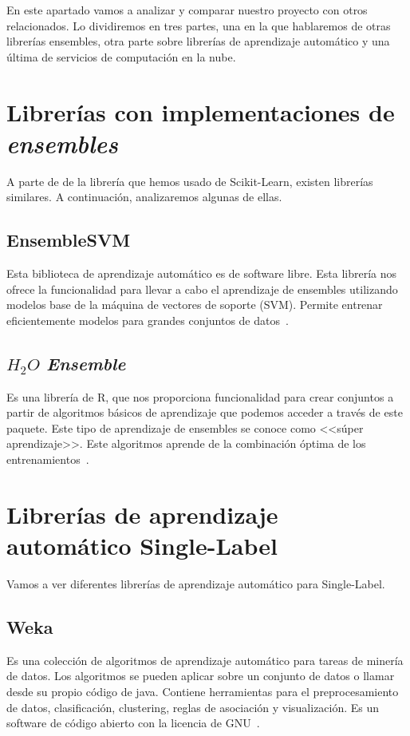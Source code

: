 En este apartado vamos a analizar y comparar nuestro proyecto con otros relacionados. Lo dividiremos en tres partes, una en la que hablaremos de otras librerías ensembles, otra parte sobre librerías de aprendizaje automático y una última de servicios de computación en la nube.

\section{Librerías con implementaciones de \textit{ensembles}}
A parte de de la librería que hemos usado de Scikit-Learn, existen librerías similares. A continuación, analizaremos algunas de ellas.

\subsection{EnsembleSVM}
Esta biblioteca de aprendizaje automático es de software libre. Esta librería nos ofrece la funcionalidad para llevar a cabo el aprendizaje de ensembles utilizando modelos base de la máquina de vectores de soporte (SVM). Permite entrenar eficientemente modelos para grandes conjuntos de datos~\cite{ensembleSVM}.

\subsection{$H_2O$ \textit{Ensemble}}
Es una librería de R, que nos proporciona funcionalidad para crear conjuntos a partir de algoritmos básicos de aprendizaje que podemos acceder a través de este paquete. Este tipo de aprendizaje de ensembles se conoce como <<súper aprendizaje>>. Este algoritmos aprende de la combinación óptima de los entrenamientos~\cite{ensembleh2o}.

\section{Librerías de aprendizaje automático Single-Label}
Vamos a ver diferentes librerías de aprendizaje automático para Single-Label.
\subsection{Weka}
Es una colección de algoritmos de aprendizaje automático para tareas de minería de datos. Los algoritmos se pueden aplicar sobre un conjunto de datos o llamar desde su propio código de java. Contiene herramientas para el preprocesamiento de datos, clasificación, clustering, reglas de asociación y visualización. Es un software de código abierto con la licencia de GNU~\cite{weka}. 

